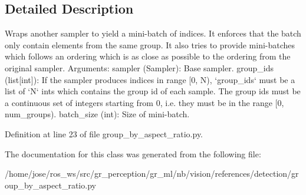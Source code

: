 \subsection{Detailed Description}
\begin{DoxyVerb}Wraps another sampler to yield a mini-batch of indices.
It enforces that the batch only contain elements from the same group.
It also tries to provide mini-batches which follows an ordering which is
as close as possible to the ordering from the original sampler.
Arguments:
    sampler (Sampler): Base sampler.
    group_ids (list[int]): If the sampler produces indices in range [0, N),
        `group_ids` must be a list of `N` ints which contains the group id of each sample.
        The group ids must be a continuous set of integers starting from
        0, i.e. they must be in the range [0, num_groups).
    batch_size (int): Size of mini-batch.
\end{DoxyVerb}
 

Definition at line 23 of file group\+\_\+by\+\_\+aspect\+\_\+ratio.\+py.



The documentation for this class was generated from the following file\+:\begin{DoxyCompactItemize}
\item 
/home/jose/ros\+\_\+ws/src/gr\+\_\+perception/gr\+\_\+ml/nb/vision/references/detection/group\+\_\+by\+\_\+aspect\+\_\+ratio.\+py\end{DoxyCompactItemize}
